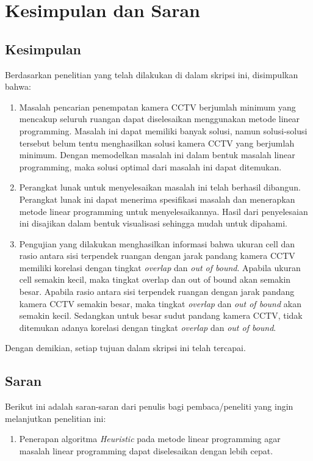 \chapter{Kesimpulan dan Saran}

\section{Kesimpulan}
Berdasarkan penelitian yang telah dilakukan di dalam skripsi ini, disimpulkan bahwa:
\begin{enumerate}
	\item Masalah pencarian penempatan kamera CCTV berjumlah minimum yang mencakup seluruh ruangan dapat diselesaikan menggunakan metode linear programming. Masalah ini dapat memiliki banyak solusi, namun solusi-solusi tersebut belum tentu menghasilkan solusi kamera CCTV yang berjumlah minimum. Dengan memodelkan masalah ini dalam bentuk masalah linear programming, maka solusi optimal dari masalah ini dapat ditemukan.
	\item Perangkat lunak untuk menyelesaikan masalah ini telah berhasil dibangun. Perangkat lunak ini dapat menerima spesifikasi masalah dan menerapkan metode linear programming untuk menyelesaikannya. Hasil dari penyelesaian ini disajikan dalam bentuk visualisasi sehingga mudah untuk dipahami.
	\item Pengujian yang dilakukan menghasilkan informasi bahwa ukuran cell dan rasio antara sisi terpendek ruangan dengan jarak pandang kamera CCTV memiliki korelasi dengan tingkat \textit{overlap} dan \textit{out of bound}. Apabila ukuran cell semakin kecil, maka tingkat overlap dan out of bound akan semakin besar. Apabila rasio antara sisi terpendek ruangan dengan jarak pandang kamera CCTV semakin besar, maka tingkat \textit{overlap} dan \textit{out of bound} akan semakin kecil. Sedangkan untuk besar sudut pandang kamera CCTV, tidak ditemukan adanya korelasi dengan tingkat \textit{overlap} dan \textit{out of bound}.
\end{enumerate}
Dengan demikian, setiap tujuan dalam skripsi ini telah tercapai.

\section{Saran}
Berikut ini adalah saran-saran dari penulis bagi pembaca/peneliti yang ingin melanjutkan penelitian ini:
\begin{enumerate}
	\item Penerapan algoritma \textit{Heuristic} pada metode linear programming agar masalah linear programming dapat diselesaikan dengan lebih cepat.
\end{enumerate}